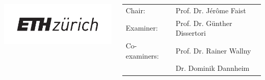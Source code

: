 \documentclass[hyperref={colorlinks=true,pdfpagelabels=false,linkcolor=black}, xcolor=dvipsnames,10pt]{beamer}
\begin{document}
{\begin{frame}[plain]
    \begin{columns}
      \centering
      \includegraphics[width=\textwidth]{figures/ETHZ_logo.pdf}
      \scriptsize{
        \begin{tabular}{l l}
          Chair: & Prof. Dr. J\'{e}r\^{o}me Faist \\
          Examiner: & Prof. Dr. G\"{u}nther Dissertori\\
          Co-examiners: &Prof. Dr. Rainer Wallny \\
                 &  Dr. Dominik Dannheim \\
        \end{tabular}
      }
    \end{columns}

  \end{frame}
}


\end{document}
